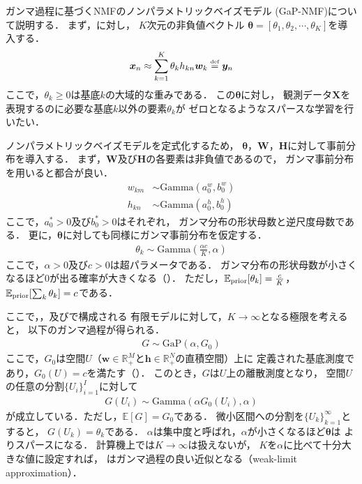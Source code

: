 ガンマ過程に基づくNMFのノンパラメトリックベイズモデル (GaP-NMF)について説明する．
まず，に対し，
$K$次元の非負値ベクトル
$\bm\theta = [\theta_1,\theta_2,\cdots,\theta_K]$を導入する．
\begin{align}
 \bm{x}_n \approx 
 \sum_{k=1}^{K} \theta_k h_{kn} \bm{w}_k \overset{\mbox{\tiny def}}{=} \bm{y}_n
\end{align}
ここで，$\theta_k \ge 0$は基底$k$の大域的な重みである．
この$\bm\theta$に対し，
観測データ$\bm{X}$を表現するのに必要な基底$k$以外の要素$\theta_k$が
ゼロとなるようなスパースな学習を行いたい．

ノンパラメトリックベイズモデルを定式化するため，
$\bm\theta$，$\bm{W}$，$\bm{H}$に対して事前分布を導入する．
まず，$\bm{W}$及び$\bm{H}$の各要素は非負値であるので，
ガンマ事前分布を用いると都合が良い．
\begin{align}
w_{km} &\sim \mbox{Gamma}(a_0^w, b_0^w)
\label{eqn:p_w_km}
\\
h_{kn} &\sim \mbox{Gamma}(a_0^h, b_0^h)
\label{eqn:p_h_kn}
\end{align}
ここで，$a_0^* > 0$及び$b_0^* > 0$はそれぞれ，
ガンマ分布の形状母数と逆尺度母数である．
更に，$\bm\theta$に対しても同様にガンマ事前分布を仮定する．
\begin{eqnarray}
 \theta_k \sim \mbox{Gamma}\left(\frac{\alpha c}{K}, \alpha\right)
  \label{eqn:p_t_k}
\end{eqnarray}
ここで，$\alpha > 0$及び$c > 0$は超パラメータである．
ガンマ分布の形状母数が小さくなるほど0が出る確率が大きくなる（）．
ただし，$\mathbb{E}_{\mbox{\scriptsize prior}}[\theta_k] = \frac{c}{K}$，
$\mathbb{E}_{\mbox{\scriptsize prior}}[\sum_k \theta_k] = c$である．

ここで，，及びで構成される
有限モデルに対して，$K \rightarrow \infty$となる極限を考えると，
以下のガンマ過程が得られる．
\begin{eqnarray}
G \sim \mbox{GaP}(\alpha, G_0)
\end{eqnarray}
ここで，$G_0$は空間$U$（$\bm{w} \in \mathbb{R}_+^M$と$\bm{h} \in \mathbb{R}_+^N$の直積空間）上に
定義された基底測度であり，$G_0(U) = c$を満たす（）．
このとき，$G$は$U$上の離散測度となり，
空間$U$の任意の分割$\{U_i\}_{i=1}^I$に対して
\begin{align}
G(U_i) \sim \mbox{Gamma}(\alpha G_0(U_i), \alpha)
\end{align}
が成立している．ただし，$\mathbb{E}[G] = G_0$である．
微小区間への分割を$\{U_k\}_{k=1}^\infty$とすると，
$G(U_k) = \theta_k$である．
$\alpha$は集中度と呼ばれ，$\alpha$が小さくなるほど$\bm\theta$は
よりスパースになる．
計算機上では$K \rightarrow \infty$は扱えないが，
$K$を$\alpha$に比べて十分大きな値に設定すれば，
はガンマ過程の良い近似となる（weak-limit approximation）．

